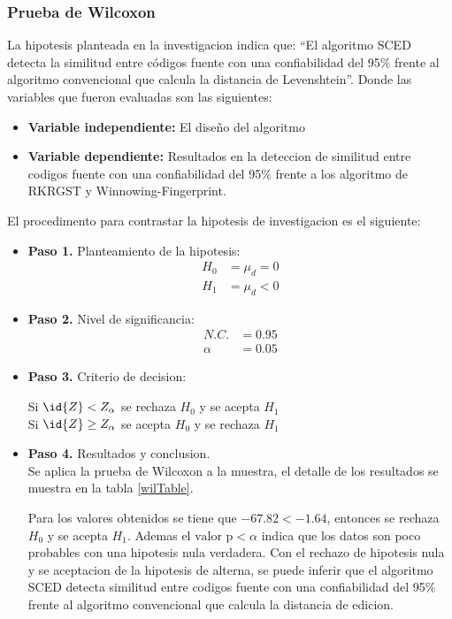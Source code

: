 \subsubsection{Prueba de Wilcoxon}
La hipotesis planteada en la investigacion indica que: ``El algoritmo SCED detecta la similitud entre códigos fuente con una confiabilidad del 95\% frente al algoritmo convencional que calcula la distancia de Levenshtein''. Donde las variables que fueron evaluadas son las siguientes:
\begin{itemize}
  \item[] \textbf{Variable independiente:} El diseño del algoritmo 
  \item[] \textbf{Variable dependiente:} Resultados en la deteccion de similitud entre codigos fuente con una confiabilidad del 95\% frente a los algoritmo de RKRGST y Winnowing-Fingerprint.
\end{itemize}

El procedimento para contrastar la hipotesis de investigacion es el siguiente:
\begin{itemize}
  \item[] \textbf{Paso 1.} Planteamiento de la hipotesis:
  \begin{equation*}
  \begin{split}
  H_0 & = \mu_d = 0 \\
  H_1 & = \mu_d < 0
  \end{split}
  \end{equation*}
  \item[] \textbf{Paso 2.} Nivel de significancia:
  \begin{equation*}
  \begin{split}
  N.C. & = 0.95 \\
  \alpha & = 0.05
  \end{split}
  \end{equation*}
  \item[] \textbf{Paso 3.} Criterio de decision:
  \begin{center}
  Si $\id{Z} < Z_\alpha$ se rechaza $H_0$ y se acepta $H_1$\\
  Si $\id{Z} \geq Z_\alpha$ se acepta $H_0$ y se rechaza $H_1$
  \end{center}
  \item[] \textbf{Paso 4.} Resultados y conclusion.\\
  Se aplica la prueba de Wilcoxon a la muestra, el detalle de los resultados se muestra en la tabla \ref{wilTable}.
  
  
  Para los valores obtenidos se tiene que $-67.82 < -1.64$, entonces se rechaza $H_0$ y se acepta $H_1$. Ademas el $\text{valor p} < \alpha$ indica que los datos son poco probables con una hipotesis nula verdadera. Con el rechazo de hipotesis nula y se aceptacion de la hipotesis de alterna, se puede inferir que el algoritmo SCED detecta similitud entre codigos fuente con una confiabilidad del 95\% frente al algoritmo convencional que calcula la distancia de edicion.
\end{itemize}
